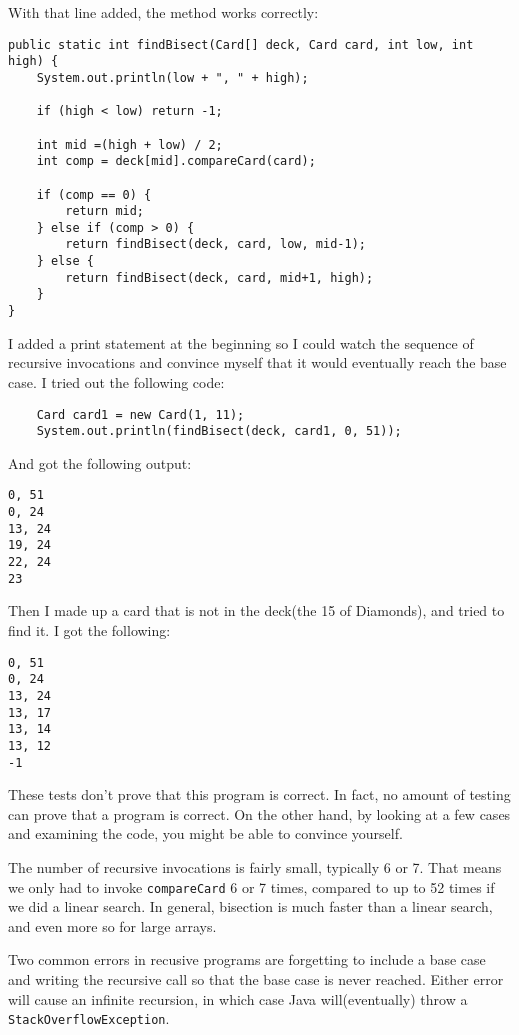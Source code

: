 \documentclass{book}
\begin{document}
With that line added, the method works correctly:

\begin{verbatim}
public static int findBisect(Card[] deck, Card card, int low, int high) {
    System.out.println(low + ", " + high);

    if (high < low) return -1;

    int mid =(high + low) / 2;
    int comp = deck[mid].compareCard(card);

    if (comp == 0) {
        return mid;
    } else if (comp > 0) {
        return findBisect(deck, card, low, mid-1);
    } else {
        return findBisect(deck, card, mid+1, high);
    }
}
\end{verbatim}

I added a print statement at the beginning so I could watch
the sequence of recursive invocations and convince myself
that it would eventually reach the base case.  I tried out the
following code:

\begin{verbatim}
    Card card1 = new Card(1, 11);
    System.out.println(findBisect(deck, card1, 0, 51));
\end{verbatim}
%
And got the following output:

\begin{verbatim}
0, 51
0, 24
13, 24
19, 24
22, 24
23
\end{verbatim}
%
Then I made up a card that is not in the deck(the 15 of Diamonds),
and tried to find it.  I got the following:

\begin{verbatim}
0, 51
0, 24
13, 24
13, 17
13, 14
13, 12
-1
\end{verbatim}
%
These tests don't prove that this program is correct.  In fact, no
amount of testing can prove that a program is correct.  On the other
hand, by looking at a few cases and examining the code, you might be
able to convince yourself.


The number of recursive invocations is fairly small, typically 6 or 7.
That means we only had to invoke {\tt compareCard} 6 or 7 times,
compared to up to 52 times if we did a linear search.  In general,
bisection is much faster than a linear search, and even more so for
large arrays.

Two common errors in recusive programs are forgetting to include a
base case and writing the recursive call so that the base case is never
reached.  Either error will cause an infinite recursion, in which case
Java will(eventually) throw a {\tt StackOverflowException}.
\end{document}
